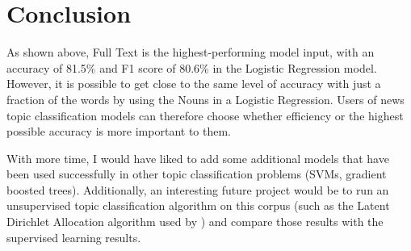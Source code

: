 \documentclass[11pt,a4paper,table]{article}
\begin{document}
\begin{table}
\centering
{}
\caption{Weighted F1 Scores on Test Data}
\label{tbl:f1}
\end{table}

\section{Conclusion}
\label{sec:conc}

As shown above, Full Text is the highest-performing model input, with an accuracy of 81.5\% and F1 score of 80.6\% in the Logistic Regression model. However, it is possible to get close to the same level of accuracy with just a fraction of the words by using the Nouns in a Logistic Regression. Users of news topic classification models can therefore choose whether efficiency or the highest possible accuracy is more important to them.

With more time, I would have liked to add some additional models that have been used successfully in other topic classification problems (SVMs, gradient boosted trees). Additionally, an interesting future project would be to run an unsupervised topic classification algorithm on this corpus (such as the Latent Dirichlet Allocation algorithm used by \citet{Martin:15}) and compare those results with the supervised learning results.

\end{document}
